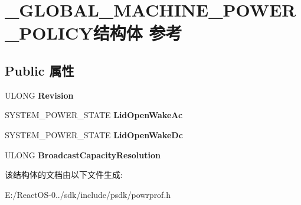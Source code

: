 \hypertarget{struct___g_l_o_b_a_l___m_a_c_h_i_n_e___p_o_w_e_r___p_o_l_i_c_y}{}\section{\+\_\+\+G\+L\+O\+B\+A\+L\+\_\+\+M\+A\+C\+H\+I\+N\+E\+\_\+\+P\+O\+W\+E\+R\+\_\+\+P\+O\+L\+I\+C\+Y结构体 参考}
\label{struct___g_l_o_b_a_l___m_a_c_h_i_n_e___p_o_w_e_r___p_o_l_i_c_y}
\subsection*{Public 属性}
\begin{DoxyCompactItemize}
\item 
\mbox{\label{struct___g_l_o_b_a_l___m_a_c_h_i_n_e___p_o_w_e_r___p_o_l_i_c_y_af703fddd93520e19bf88db23e570fa1d}} 
U\+L\+O\+NG {\bfseries Revision}
\item 
\mbox{\label{struct___g_l_o_b_a_l___m_a_c_h_i_n_e___p_o_w_e_r___p_o_l_i_c_y_adcf4af4c52d3689fee5bae5f39dc6abb}} 
S\+Y\+S\+T\+E\+M\+\_\+\+P\+O\+W\+E\+R\+\_\+\+S\+T\+A\+TE {\bfseries Lid\+Open\+Wake\+Ac}
\item 
\mbox{\label{struct___g_l_o_b_a_l___m_a_c_h_i_n_e___p_o_w_e_r___p_o_l_i_c_y_a811de7bd43e7afdc10877d553571ee4b}} 
S\+Y\+S\+T\+E\+M\+\_\+\+P\+O\+W\+E\+R\+\_\+\+S\+T\+A\+TE {\bfseries Lid\+Open\+Wake\+Dc}
\item 
\mbox{\label{struct___g_l_o_b_a_l___m_a_c_h_i_n_e___p_o_w_e_r___p_o_l_i_c_y_aefa14f8154b789e82a501b3edc0d22d2}} 
U\+L\+O\+NG {\bfseries Broadcast\+Capacity\+Resolution}
\end{DoxyCompactItemize}


该结构体的文档由以下文件生成\+:\begin{DoxyCompactItemize}
\item 
E\+:/\+React\+O\+S-\/0../sdk/include/psdk/powrprof.\+h\end{DoxyCompactItemize}
